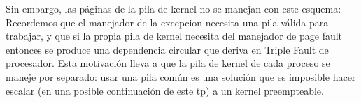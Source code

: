 Sin embargo, las p\'aginas de la pila de kernel no se manejan con este esquema: Recordemos que el manejador de la excepcion necesita una
pila v\'alida para trabajar, y que si la propia pila de kernel necesita del manejador de page fault entonces se produce una dependencia
circular que deriva en Triple Fault de procesador. Esta motivaci\'on lleva a que la pila de kernel de cada proceso se maneje por separado:
usar una pila com\'un es una soluci\'on que es imposible hacer escalar (en una posible continuaci\'on de este tp) a un kernel preempteable.
